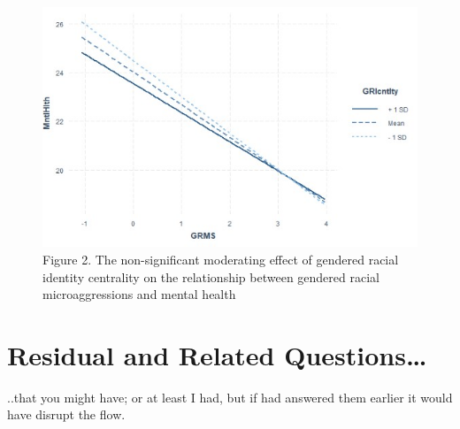 \documentclass[
]{book}
\begin{document}
\begin{figure}
\centering
\includegraphics{images/Modmed/GRMS_MH_GRIC.jpg}
\caption{Figure 2. The non-significant moderating effect of gendered racial identity centrality on the relationship between gendered racial microaggressions and mental health}
\end{figure}

\hypertarget{residual-and-related-questions-2}{%
\section{Residual and Related Questions\ldots{}}\label{residual-and-related-questions-2}}

..that you might have; or at least I had, but if had answered them earlier it would have disrupt the flow.
\end{document}
